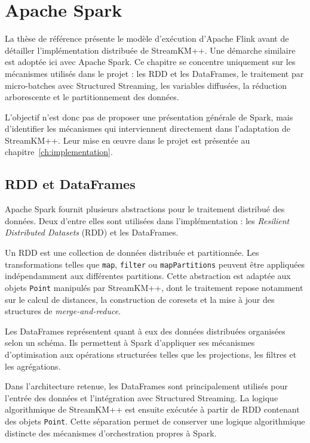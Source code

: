 
\chapter{Apache Spark}
\label{ch:spark}

La thèse de référence présente le modèle d'exécution d'Apache Flink avant de détailler l'implémentation distribuée de StreamKM++. Une démarche similaire est adoptée ici avec Apache Spark. Ce chapitre se concentre uniquement sur les mécanismes utilisés dans le projet : les RDD et les DataFrames, le traitement par micro-batches avec Structured Streaming, les variables diffusées, la réduction arborescente et le partitionnement des données.

L'objectif n'est donc pas de proposer une présentation générale de Spark, mais d'identifier les mécanismes qui interviennent directement dans l'adaptation de StreamKM++. Leur mise en œuvre dans le projet est présentée au chapitre~\ref{ch:implementation}.

\section{RDD et DataFrames}

Apache Spark fournit plusieurs abstractions pour le traitement distribué des données. Deux d'entre elles sont utilisées dans l'implémentation : les \emph{Resilient Distributed Datasets} (RDD) et les DataFrames.

Un RDD est une collection de données distribuée et partitionnée. Les transformations telles que \texttt{map}, \texttt{filter} ou \texttt{mapPartitions} peuvent être appliquées indépendamment aux différentes partitions. Cette abstraction est adaptée aux objets \texttt{Point} manipulés par StreamKM++, dont le traitement repose notamment sur le calcul de distances, la construction de coresets et la mise à jour des structures de \emph{merge-and-reduce}.

Les DataFrames représentent quant à eux des données distribuées organisées selon un schéma. Ils permettent à Spark d'appliquer ses mécanismes d'optimisation aux opérations structurées telles que les projections, les filtres et les agrégations.

Dans l'architecture retenue, les DataFrames sont principalement utilisés pour l'entrée des données et l'intégration avec Structured Streaming. La logique algorithmique de StreamKM++ est ensuite exécutée à partir de RDD contenant des objets \texttt{Point}. Cette séparation permet de conserver une logique algorithmique distincte des mécanismes d'orchestration propres à Spark.

